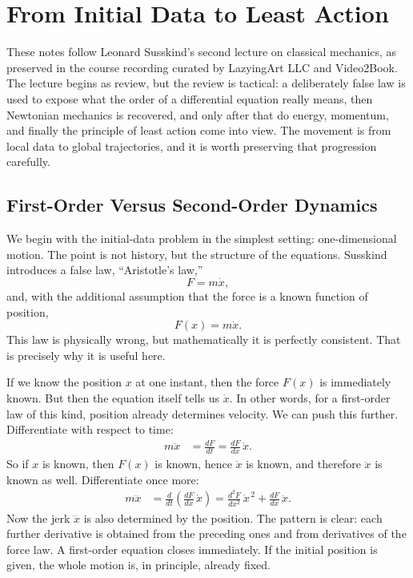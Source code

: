 \chapter{From Initial Data to Least Action}

These notes follow Leonard Susskind's second lecture on classical mechanics, as preserved in the course recording curated by LazyingArt LLC and Video2Book. The lecture begins as review, but the review is tactical: a deliberately false law is used to expose what the order of a differential equation really means, then Newtonian mechanics is recovered, and only after that do energy, momentum, and finally the principle of least action come into view. The movement is from local data to global trajectories, and it is worth preserving that progression carefully.

\section{First-Order Versus Second-Order Dynamics}

We begin with the initial-data problem in the simplest setting: one-dimensional motion. The point is not history, but the structure of the equations. Susskind introduces a false law, ``Aristotle's law,''
\begin{equation}
F=m\dot x,
\end{equation}
and, with the additional assumption that the force is a known function of position,
\begin{equation}
F(x)=m\dot x.
\end{equation}
This law is physically wrong, but mathematically it is perfectly consistent. That is precisely why it is useful here.

If we know the position \(x\) at one instant, then the force \(F(x)\) is immediately known. But then the equation itself tells us \(\dot x\). In other words, for a first-order law of this kind, position already determines velocity. We can push this further. Differentiate with respect to time:
\begin{align}
m\ddot x &= \frac{dF}{dt}
= \frac{dF}{dx}\,\dot x.
\end{align}
So if \(x\) is known, then \(F(x)\) is known, hence \(\dot x\) is known, and therefore \(\ddot x\) is known as well. Differentiate once more:
\begin{align}
m\dddot x
&= \frac{d}{dt}\!\left(\frac{dF}{dx}\,\dot x\right)
= \frac{d^2F}{dx^2}\,\dot x^{\,2} + \frac{dF}{dx}\,\ddot x.
\end{align}
Now the jerk \(\dddot x\) is also determined by the position. The pattern is clear: each further derivative is obtained from the preceding ones and from derivatives of the force law. A first-order equation closes immediately. If the initial position is given, the whole motion is, in principle, already fixed.

